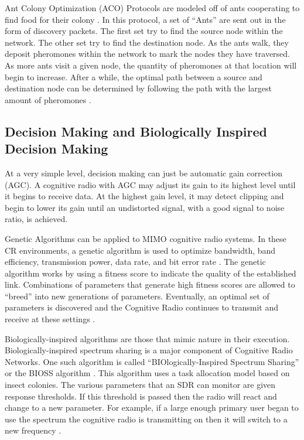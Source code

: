 Ant Colony Optimization (ACO) Protocols are modeled off of ants cooperating to find food for their colony \cite{7030885}. In this protocol, a set of ``Ants'' are sent out in the form of discovery packets. The first set try to find the source node within the network. The other set try to find the destination node. As the ants walk, they deposit pheromones within the network to mark the nodes they have traversed. As more ants visit a given node, the quantity of pheromones at that location will begin to increase. After a while, the optimal path between a source and destination node can be determined by following the path with the largest amount of pheromones \cite{7030885}. 

\subsection{Decision Making and Biologically Inspired Decision Making}

At a very simple level, decision making can just be automatic gain correction (AGC). A cognitive radio with AGC may adjust its gain to its highest level until it begins to receive data. At the highest gain level, it may detect clipping and begin to lower its gain until an undistorted signal, with a good signal to noise ratio, is achieved. \cite{6497193}

Genetic Algorithms can be applied to MIMO cognitive radio systems. In these CR environments, a genetic algorithm is used to optimize bandwidth, band efficiency, transmission power, data rate, and bit error rate \cite{7124804}. The genetic algorithm works by using a fitness score to indicate the quality of the established link. Combinations of parameters that generate high fitness scores are allowed to ``breed'' into new generations of parameters. Eventually, an optimal set of parameters is discovered and the Cognitive Radio continues to transmit and receive at these settings \cite{7124804}.

Biologically-inspired algorithms are those that mimic nature in their execution. Biologically-inspired spectrum sharing is a major component of Cognitive Radio Networks. One such algorithm is called ``BIOlogically-Inspired Spectrum Sharing'' or the BIOSS algorithm \cite{4224259} \cite{5686503}. This algorithm uses a task allocation model based on insect colonies. The various parameters that an SDR can monitor are given response thresholds. If this threshold is passed then the radio will react and change to a new parameter. For example, if a large enough primary user began to use the spectrum the cognitive radio is transmitting on then it will switch to a new frequency \cite{4224259} \cite{5686503}. 

